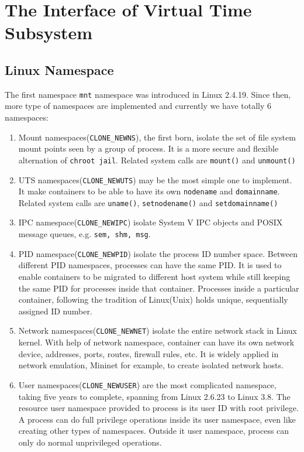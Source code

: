 \documentclass{acm_proc_article-sp}
\begin{document}
\section{The Interface of Virtual Time Subsystem}
\subsection{Linux Namespace}

The first namespace \texttt{mnt} namespace was introduced in Linux 2.4.19. 
Since then, more type of namespaces are implemented and currently we have totally 6 namespaces:
\begin{enumerate}
\item Mount namespaces(\texttt{CLONE\_NEWNS}), the first born, isolate the set of file system mount points seen by a group of process\cite{lwn:namespace:overview}. It is a more secure and flexible alternation of \texttt{chroot jail}. Related system calls are \texttt{mount()} and \texttt{unmount()}

\item UTS namespaces(\texttt{CLONE\_NEWUTS}) may be the most simple one to implement. It make containers to be able to have its own \texttt{nodename} and \texttt{domainname}\cite{lwn:namespace:overview}. Related system calls are \texttt{uname()}, \texttt{setnodename()} and \texttt{setdomainname()} 

\item IPC namespace(\texttt{CLONE\_NEWIPC}) isolate System V IPC objects and POSIX message queues, e.g. \texttt{sem, shm, msg}. 

\item PID namespace(\texttt{CLONE\_NEWPID}) isolate the process ID number space. Between different PID namespaces, processes can have the same PID. 
It is used to enable containers to be migrated to different host system while still keeping the same PID for processes inside that container. 
Processes inside a particular container, following the tradition of Linux(Unix) holds unique, sequentially assigned ID number.\cite{lwn:namespace:pid}

\item Network namespaces(\texttt{CLONE\_NEWNET}) isolate the entire network stack in Linux kernel. With help of network namespace, container can have its own network device, addresses, ports, routes, firewall rules, etc\cite{lwn:namespace:net}. 
It is widely applied in network emulation, Mininet\cite{mininet} for example, to create isolated network hosts.

\item User namespaces(\texttt{CLONE\_NEWUSER}) are the most complicated namespace, taking five years to complete, spanning from Linux 2.6.23 to Linux 3.8\cite{lwn:namespace:user}. 
The resource user namespace provided to process is its user ID with root privilege. 
A process can do full privilege operations inside its user namespace, even like creating other types of namespaces. Outside it user namespace, process can only do normal unprivileged operations.
\end{enumerate}
\end{document}
